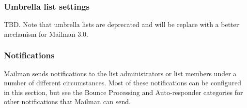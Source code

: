 \documentclass{howto}
\begin{document}
\subsubsection{Umbrella list settings}

TBD.  Note that umbrella lists are deprecated and will be replace with
a better mechanism for Mailman 3.0.

\subsubsection{Notifications}

Mailman sends notifications to the list administrators or list members
under a number of different circumstances.  Most of these
notifications can be configured in this section, but see the Bounce
Processing and Auto-responder categories for other notifications that
Mailman can send.
\end{document}
